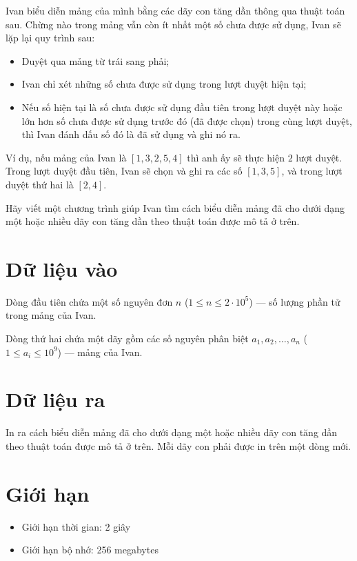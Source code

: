 \documentclass[12pt,a4paper]{article}
\begin{document}
Ivan biểu diễn mảng của mình bằng các dãy con tăng dần thông qua thuật toán sau. Chừng nào trong mảng vẫn còn ít nhất một số chưa được sử dụng, Ivan sẽ lặp lại quy trình sau:
\begin{itemize}
    \item Duyệt qua mảng từ trái sang phải;
    \item Ivan chỉ xét những số chưa được sử dụng trong lượt duyệt hiện tại;
    \item Nếu số hiện tại là số chưa được sử dụng đầu tiên trong lượt duyệt này hoặc lớn hơn số chưa được sử dụng trước đó (đã được chọn) trong cùng lượt duyệt, thì Ivan đánh dấu số đó là đã sử dụng và ghi nó ra.
\end{itemize}

Ví dụ, nếu mảng của Ivan là $[1, 3, 2, 5, 4]$ thì anh ấy sẽ thực hiện $2$ lượt duyệt. Trong lượt duyệt đầu tiên, Ivan sẽ chọn và ghi ra các số $[1, 3, 5]$, và trong lượt duyệt thứ hai là $[2, 4]$.

Hãy viết một chương trình giúp Ivan tìm cách biểu diễn mảng đã cho dưới dạng một hoặc nhiều dãy con tăng dần theo thuật toán được mô tả ở trên.

\section*{Dữ liệu vào}
Dòng đầu tiên chứa một số nguyên đơn $n$ ($1 \le n \le 2 \cdot 10^5$) — số lượng phần tử trong mảng của Ivan.

Dòng thứ hai chứa một dãy gồm các số nguyên phân biệt $a_1, a_2, \ldots, a_n$ ($1 \le a_i \le 10^9$) — mảng của Ivan.

\section*{Dữ liệu ra}
In ra cách biểu diễn mảng đã cho dưới dạng một hoặc nhiều dãy con tăng dần theo thuật toán được mô tả ở trên. Mỗi dãy con phải được in trên một dòng mới.

\section*{Giới hạn}
\begin{constraintbox}
    \begin{itemize}
        \item Giới hạn thời gian: 2 giây
        \item Giới hạn bộ nhớ: 256 megabytes
    \end{itemize}
\end{constraintbox}
\end{document}
